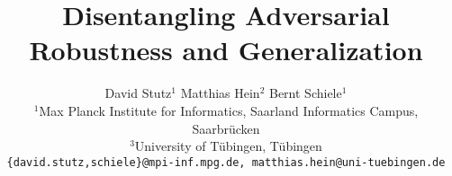 \documentclass[10pt,twocolumn,letterpaper]{article}
\begin{document}
\title{Disentangling Adversarial Robustness and Generalization}
\author{David Stutz$^{1}$ \qquad Matthias Hein$^{2}$ \qquad Bernt Schiele$^{1}$\\
$^1$Max Planck Institute for Informatics, Saarland Informatics Campus, Saarbr\"{u}cken\\
$^3$University of T\"{u}bingen, T\"{u}bingen\\
{\tt\small \{david.stutz,schiele\}@mpi-inf.mpg.de, matthias.hein@uni-tuebingen.de}	
}

\maketitle
\thispagestyle{empty}







{\small


}

\clearpage

\end{document}
